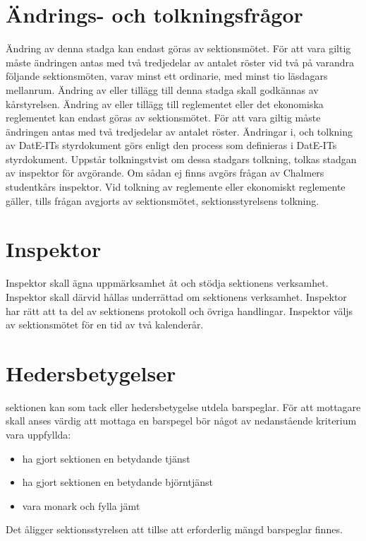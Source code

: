 \documentclass[a4paper]{dteklag}
\begin{document}
\section{Ändrings- och tolkningsfrågor}
\para[Stadgeändringar] Ändring av denna stadga kan endast göras av sektionsmötet. För att vara giltig måste ändringen antas med två tredjedelar av antalet röster vid två på varandra följande sektionsmöten, varav minst ett ordinarie, med minst tio läsdagars mellanrum.
\stycke Ändring av eller tillägg till denna stadga skall godkännas av kårstyrelsen.
\para[Reglementesändring] Ändring av eller tillägg till reglementet eller det ekonomiska reglementet kan endast göras av sektionsmötet. För att vara giltig måste ändringen antas med två tredjedelar av antalet röster.
 Ändringar i, och tolkning av DatE-ITs styrdokument görs enligt den process som definieras i DatE-ITs styrdokument.
\para[Tolkningstvist] Uppstår tolkningstvist om dessa stadgars tolkning, tolkas stadgan av inspektor för avgörande. Om sådan ej finns avgörs frågan av Chalmers studentkårs inspektor.
\stycke Vid tolkning av reglemente eller ekonomiskt reglemente gäller, tills frågan avgjorts av sektionsmötet, sektionsstyrelsens tolkning.

\section{Inspektor}
\para[Allmänt] Inspektor skall ägna uppmärksamhet åt och stödja sektionens verksamhet. Inspektor skall därvid hållas underrättad om sektionens verksamhet. Inspektor har rätt att ta del av sektionens protokoll och övriga handlingar.
\para[Val] Inspektor väljs av sektionsmötet för en tid av två kalenderår.

\section{Hedersbetygelser}
\para[Allmänt] sektionen kan som tack eller hedersbetygelse utdela barspeglar.
\para[Kriterier] För att mottagare skall anses värdig att mottaga en barspegel bör något av nedanstående kriterium vara uppfyllda:
\begin{itemize}
\item ha gjort sektionen en betydande tjänst
\item ha gjort sektionen en betydande björntjänst
\item vara monark och fylla jämt
\end{itemize}
\para[Införskaffande] Det åligger sektionsstyrelsen att tillse att erforderlig mängd barspeglar finnes.
\end{document}
